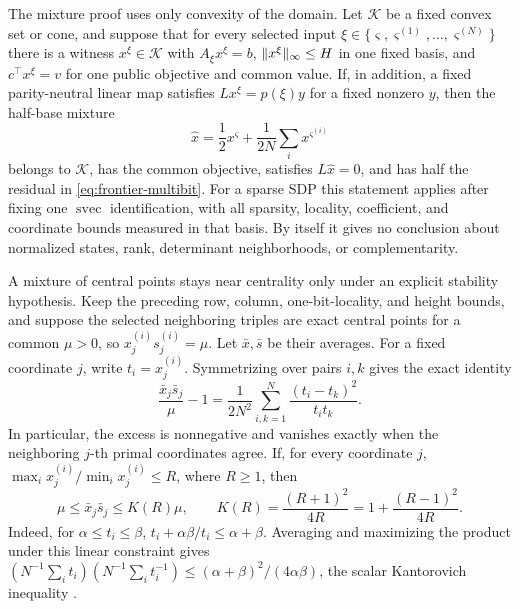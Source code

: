The mixture proof uses only convexity of the domain.  Let \(\mathcal K\) be
a fixed convex set or cone, and suppose that for every selected input
\(\xi\in\{\varsigma,\varsigma^{(1)},\ldots,\varsigma^{(N)}\}\) there is a
witness \(x^\xi\in\mathcal K\) with
\(A_\xi x^\xi=b\), \(\lVert x^\xi\rVert_\infty\leq H\) in one fixed basis, and
\(c^\top x^\xi=v\) for one public objective and common value.  If, in
addition, a fixed parity-neutral linear map satisfies
\(Lx^\xi=p(\xi)y\) for a fixed nonzero \(y\), then the half-base mixture
\[
 \widehat x=\frac12x^\varsigma+
              \frac1{2N}\sum_i x^{\varsigma^{(i)}}
\]
belongs to \(\mathcal K\), has the common objective, satisfies
\(L\widehat x=0\), and has half the residual in
\eqref{eq:frontier-multibit}.  For a sparse SDP this statement applies after
fixing one \(\operatorname{svec}\) identification, with all sparsity,
locality, coefficient, and coordinate bounds measured in that basis.  By
itself it gives no conclusion about normalized states, rank, determinant
neighborhoods, or complementarity.

A mixture of central points stays near centrality only under an explicit
stability hypothesis.  Keep the preceding row, column, one-bit-locality, and
height bounds, and suppose the selected neighboring triples are exact
central points for a common \(\mu>0\), so \(x_j^{(i)}s_j^{(i)}=\mu\).  Let
\(\bar x,\bar s\) be their averages.  For a fixed coordinate \(j\), write
\(t_i=x_j^{(i)}\).  Symmetrizing over pairs \(i,k\) gives the exact
identity
\begin{equation}
 \boxed{
 \frac{\bar x_j\bar s_j}{\mu}-1
 =\frac1{2N^2}\sum_{i,k=1}^N
   \frac{(t_i-t_k)^2}{t_it_k}.}
 \label{eq:frontier-multiplicative-variance}
\end{equation}
In particular, the excess is nonnegative and vanishes exactly when the
neighboring \(j\)-th primal coordinates agree.  If, for every coordinate
\(j\),
\(\max_i x_j^{(i)}/\min_i x_j^{(i)}\leq R\), where \(R\geq1\), then
\begin{equation}
 \mu\leq\bar x_j\bar s_j\leq K(R)\mu,
 \qquad K(R)=\frac{(R+1)^2}{4R}
 =1+\frac{(R-1)^2}{4R}.
 \label{eq:frontier-kantorovich}
\end{equation}
Indeed, for \(\alpha\leq t_i\leq\beta\),
\(t_i+\alpha\beta/t_i\leq\alpha+\beta\).  Averaging and maximizing the
product under this linear constraint gives
\((N^{-1}\sum_it_i)(N^{-1}\sum_it_i^{-1})
\leq(\alpha+\beta)^2/(4\alpha\beta)\), the scalar Kantorovich inequality
\cite{kantorovich1948-functional-analysis-applied-mathematics}.

